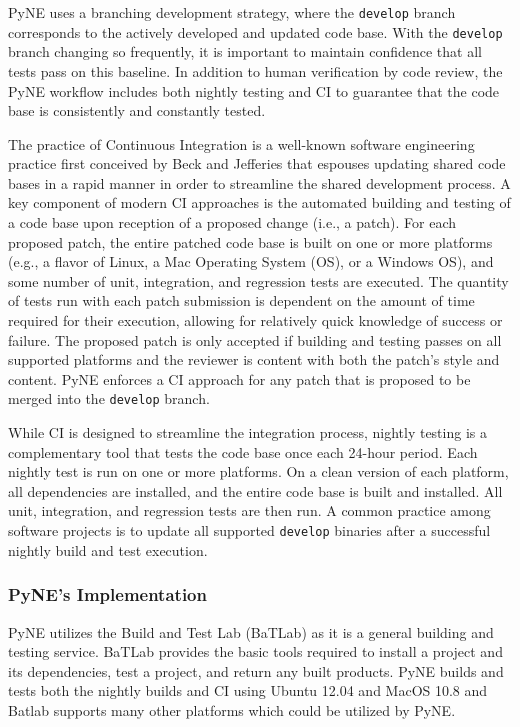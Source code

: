 \documentclass{anstrans}
\begin{document}
PyNE uses a branching
development strategy, where the \texttt{develop} branch corresponds to the
actively developed and updated code base.
With the \texttt{develop} branch changing so frequently, it is important to maintain confidence that all tests pass on this baseline.
In addition to human verification by code review, the PyNE
workflow includes both nightly testing and CI to
guarantee that the code base is consistently and constantly tested.

The practice of Continuous Integration is a well-known software engineering
practice first conceived by Beck and Jefferies \cite{beck1998extreme} that
espouses updating shared code bases in a rapid manner in order to streamline the
shared development process. A key component of modern CI approaches is the
automated building and testing of a code base upon reception of a proposed
change (i.e., a patch). For each proposed patch, the entire patched code base is
built on one or more platforms (e.g., a flavor of Linux, a Mac Operating System
(OS), or a Windows OS), and some number of unit, integration, and regression
tests are executed. The quantity of tests run with each patch submission is
dependent on the amount of time required for their execution, allowing for
relatively quick knowledge of success or failure. The proposed patch is only
accepted if building and testing passes on all supported platforms and the
reviewer is content with both the patch's style and content. PyNE enforces a CI
approach for any patch that is proposed to be merged into the \texttt{develop}
branch.

While CI is designed to streamline the integration process, nightly testing is a
complementary tool that tests the code base once each 24-hour
period. Each nightly test is run on one or more platforms. On a clean version of
each platform, all dependencies are installed, and the entire code base is built
and installed. All unit, integration, and regression tests are then run. 
A common practice among software projects is to update all supported \texttt{develop}
binaries after a successful nightly build and test execution.

\subsubsection{PyNE's Implementation}

PyNE utilizes the Build and Test Lab (BaTLab) \cite{batlab_2014} as it is a general
building and testing service. BaTLab provides the basic tools required to
install a project and its dependencies, test a project, and return any built
products. PyNE builds and tests both the nightly builds and CI using
Ubuntu 12.04 and MacOS 10.8 and Batlab supports many other platforms which could be utilized by PyNE.
\end{document}

